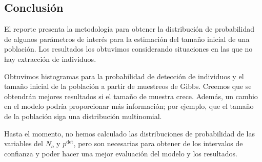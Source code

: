 \documentclass{article}
\begin{document}
\subsection*{Conclusi\'on}
El reporte presenta la metodolog\'ia para obtener la distribuci\'on de
probabilidad de algunos par\'ametros de inter\'es para la estimaci\'on del
tama\~no inicial de una poblaci\'on. Los resultados los obtuvimos
considerando situaciones en las que no hay extracci\'on de individuos.

Obtuvimos histogramas para la probabilidad de detecci\'on de individuos y el
tama\~no inicial de la poblaci\'on a partir de muestreos de Gibbs. Creemos que
se obtendr\'an mejores resultados si el tama\~no de muestra crece. Adem\'as,
un cambio en el modelo podr\'ia proporcionar m\'as informaci\'on; por ejemplo,
que el tama\~no de la poblaci\'on siga una distribuci\'on multinomial.

Hasta el momento, no hemos calculado las distribuciones de probabilidad de
las variables del $N_o$ y $p^{\mbox{det}}$, pero son necesarias para obtener
de los intervalos de confianza y poder hacer una mejor evaluaci\'on del modelo y
los resultados.

\newpage


\end{document}
